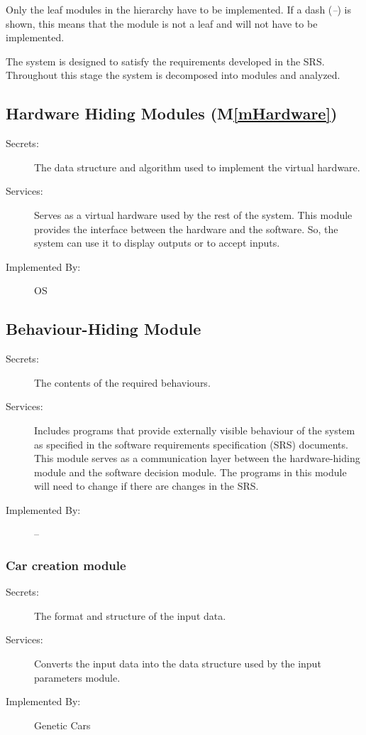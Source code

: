 \documentclass[12pt, titlepage]{article}
\newcommand{\mref}[1]{M\ref{#1}}
\begin{document}
Only the leaf modules in the
hierarchy have to be implemented. If a dash (\emph{--}) is shown, this means
that the module is not a leaf and will not have to be implemented. 

The system is designed to satisfy the requirements developed in the SRS. Throughout
this stage the system is decomposed into modules and analyzed.

\subsection{Hardware Hiding Modules (\mref{mHardware})}

\begin{description}
\item[Secrets:]The data structure and algorithm used to implement the virtual
  hardware.
\item[Services:]Serves as a virtual hardware used by the rest of the
  system. This module provides the interface between the hardware and the
  software. So, the system can use it to display outputs or to accept inputs.
\item[Implemented By:] OS
\end{description}

\subsection{Behaviour-Hiding Module}

\begin{description}
\item[Secrets:]The contents of the required behaviours.
\item[Services:]Includes programs that provide externally visible behaviour of
  the system as specified in the software requirements specification (SRS)
  documents. This module serves as a communication layer between the
  hardware-hiding module and the software decision module. The programs in this
  module will need to change if there are changes in the SRS.
\item[Implemented By:] --
\end{description}

\subsubsection{Car creation module}

\begin{description}
\item[Secrets:]The format and structure of the input data.
\item[Services:]Converts the input data into the data structure used by the
  input parameters module.
\item[Implemented By:] Genetic Cars
\end{description}
\end{document}
